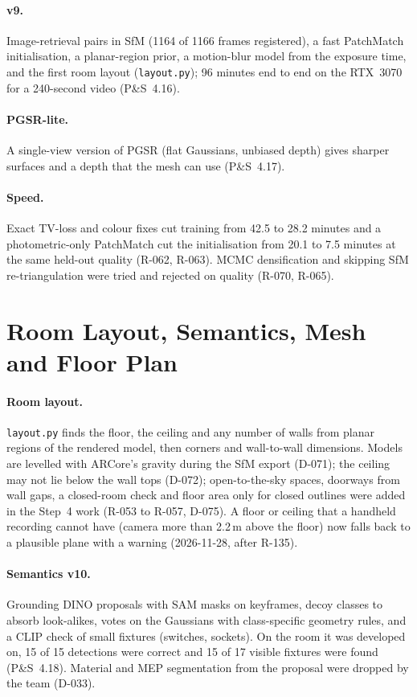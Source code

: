 \paragraph{v9.} Image-retrieval pairs in SfM (1164 of 1166 frames registered), a fast PatchMatch initialisation, a
planar-region prior, a motion-blur model from the exposure time, and the first room layout (\texttt{layout.py}); 96 minutes
end to end on the RTX~3070 for a 240-second video (P\&S~4.16).
\paragraph{PGSR-lite.} A single-view version of PGSR (flat Gaussians, unbiased depth) gives sharper surfaces and a depth
that the mesh can use (P\&S~4.17).
\paragraph{Speed.} Exact TV-loss and colour fixes cut training from 42.5 to 28.2 minutes and a photometric-only
PatchMatch cut the initialisation from 20.1 to 7.5 minutes at the same held-out quality (R-062, R-063). MCMC
densification and skipping SfM re-triangulation were tried and rejected on quality (R-070, R-065).

\section{Room Layout, Semantics, Mesh and Floor Plan}
\paragraph{Room layout.} \texttt{layout.py} finds the floor, the ceiling and any number of walls from planar regions of
the rendered model, then corners and wall-to-wall dimensions. Models are levelled with ARCore's gravity during the SfM
export (D-071); the ceiling may not lie below the wall tops (D-072); open-to-the-sky spaces, doorways from wall gaps,
a closed-room check and floor area only for closed outlines were added in the Step~4 work (R-053 to R-057, D-075). A
floor or ceiling that a handheld recording cannot have (camera more than 2.2\,m above the floor) now falls back to a
plausible plane with a warning (2026-11-28, after R-135).
\paragraph{Semantics v10.} Grounding DINO proposals with SAM masks on keyframes, decoy classes to absorb look-alikes,
votes on the Gaussians with class-specific geometry rules, and a CLIP check of small fixtures (switches, sockets).
On the room it was developed on, 15 of 15 detections were correct and 15 of 17 visible fixtures were found
(P\&S~4.18). Material and MEP segmentation from the proposal were dropped by the team (D-033).
